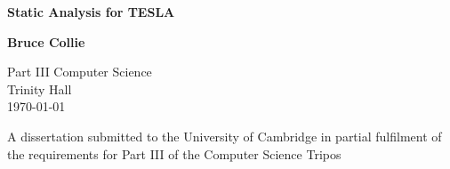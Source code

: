 \begin{titlepage}
  \begin{center}
  
  \vspace*{1cm}
  \Huge\textbf{Static Analysis for TESLA}

  \LARGE
  \vspace{1.5cm}
  \textbf{Bruce Collie}

  \vspace{0.5cm}


  \large
  Part III Computer Science \\
  Trinity Hall \\
  \today

  \vfill

  \vspace{1.5cm}

  \normalsize
  A dissertation submitted to the University of Cambridge in partial fulfilment
    of the requirements for Part III of the Computer Science Tripos
  \end{center}
\end{titlepage}
